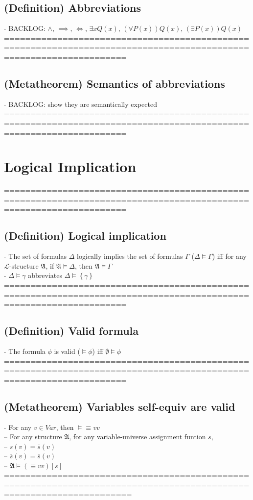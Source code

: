 \documentclass{book}
\newcommand{\extend}[1]{\overline{#1}}
\newcommand{\set}[1]{\left\{ #1 \right\}}
\begin{document}
\subsection{(Definition) Abbreviations} %
	- BACKLOG: $\land$, $\implies$, $\iff$, $\exists x Q(x)$, $(\forall P(x)) Q(x)$, $(\exists P(x)) Q(x)$ \\
	===================================================================================================================
\subsection{(Metatheorem) Semantics of abbreviations} %
	- BACKLOG: show they are semantically expected
	===================================================================================================================

\section{Logical Implication}
	===================================================================================================================
\subsection{(Definition) Logical implication} %
	- The set of formulas $\Delta$ logically implies the set of formulas $\Gamma$ ($\Delta \vDash \Gamma$) iff for any $\mathcal{L}$-structure $\mathfrak{A}$, if $\mathfrak{A} \vDash \Delta$, then $\mathfrak{A} \vDash \Gamma$ \\
	- $\Delta \vDash \gamma$ abbreviates $\Delta \vDash \set{\gamma}$ \\
	===================================================================================================================
\subsection{(Definition) Valid formula} %
	- The formula $\phi$ is valid ($\vDash \phi$) iff $\emptyset \vDash \phi$ \\
	===================================================================================================================
\subsection{(Metatheorem) Variables self-equiv are valid} %
	- For any $v \in Var$, then $\vDash \equiv v v$ \\
		-- For any structure $\mathfrak{A}$, for any variable-universe assignment funtion $s$, \\
			-- $s(v) = \extend{s}(v)$ \\
			-- $\extend{s}(v) = \extend{s}(v)$ \\
			-- $\mathfrak{A} \vDash (\equiv v v)[s]$ \\
	====================================================================================================================
\end{document}
